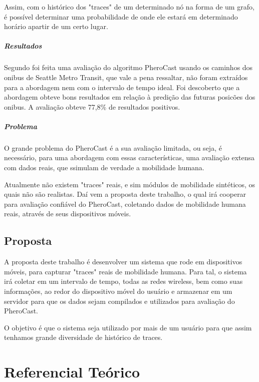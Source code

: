\documentclass[12pt, %
openright, 
oneside,
a4paper,
brazil]{facom-ufu-abntex2}
\begin{document}
Assim, com o histórico dos "traces" de um determinado nó na forma de um grafo, é possível determinar uma probabilidade de onde ele estará em determinado horário apartir de um certo lugar.

\paragraph{Resultados}
Segundo \cite{6838650} foi feita uma avaliação do algoritmo PheroCast usando os caminhos dos onibus de Seattle Metro Transit, que vale a pena ressaltar, não foram extraídos para a abordagem nem com o intervalo de tempo ideal. Foi descoberto que a abordagem obteve bons resultados em relação à predição das futuras posicões dos onibus. A avaliação obteve 77,8\% de resultados positivos. 

\paragraph{Problema}
O grande problema do PheroCast é a sua avaliação limitada, ou seja, é necessário, para uma abordagem com essas características, uma avaliação extensa com dados reais, que ssimulam de verdade a mobilidade humana. 

Atualmente não existem "traces" reais, e sim módulos de mobilidade sintéticos, os quais não são realistas. Daí vem a proposta deste trabalho, o qual irá cooperar para avaliação confiável do PheroCast, coletando dados de mobilidade humana reais, através de seus dispositivos móveis.
\section{Proposta}
A proposta deste trabalho é desenvolver um sistema que rode em dispositivos móveis, para capturar "traces" reais de mobilidade humana. Para tal, o sistema irá coletar em um intervalo de tempo, todas as redes wireless, bem como suas informações, ao redor do dispositivo móvel do usuário e armazenar em um servidor para que os dados sejam compilados e utilizados para avaliação do PheroCast.

O objetivo é que o sistema seja utilizado por mais de um usuário para que assim tenhamos grande diversidade de histórico de traces.


\chapter{Referencial Teórico}
\end{document}
